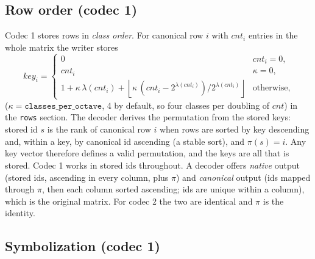 \subsection{Row order (codec 1)}
\label{spec:order}
Codec 1 stores rows in \emph{class order}. For canonical row $i$ with $\mathit{cnt}_i$ entries in the whole matrix
the writer stores
\begin{equation}
\mathit{key}_i=\begin{cases}
0 & \mathit{cnt}_i=0,\\
\mathit{cnt}_i & \kappa=0,\\
1+\kappa\,\lambda(\mathit{cnt}_i)+\left\lfloor \kappa\,(\mathit{cnt}_i-2^{\lambda(\mathit{cnt}_i)})/2^{\lambda(\mathit{cnt}_i)}\right\rfloor & \text{otherwise,}
\end{cases}
\label{spec:eq:key}
\end{equation}
($\kappa=\texttt{classes\_per\_octave}$, 4 by default, so four classes per doubling of $\mathit{cnt}$) in the
\texttt{rows} section. The decoder derives the permutation from the stored keys: stored id $s$ is the rank of
canonical row $i$ when rows are sorted by key descending and, within a key, by canonical id ascending (a stable sort),
and $\pi(s)=i$. Any key vector therefore defines a valid permutation, and the keys are all that is stored. Codec 1 works in
stored ids throughout. A decoder offers \emph{native} output (stored ids, ascending in every column, plus $\pi$) and
\emph{canonical} output (ids mapped through $\pi$, then each column sorted ascending; ids are unique within a column),
which is the original matrix. For codec 2 the two are identical and $\pi$ is the identity.

\subsection{Symbolization (codec 1)}
\label{spec:sym}
